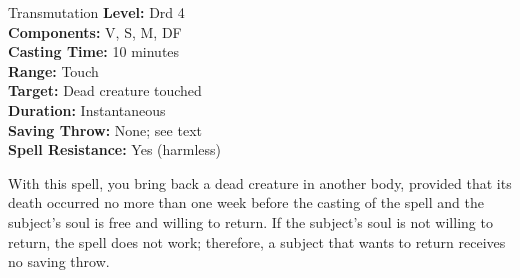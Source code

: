{Transmutation}
{
	\textbf{Level:}
	Drd 4\\
	\textbf{Components:}
	V, S, M, DF\\
	\textbf{Casting Time:}
	10 minutes\\
	\textbf{Range:}
	Touch\\
	\textbf{Target:}
	Dead creature touched\\
	\textbf{Duration:}
	Instantaneous\\
	\textbf{Saving Throw:}
	None; see text\\
	\textbf{Spell Resistance:}
	Yes (harmless)\\
}
{
	With this spell, you bring back a dead creature in another body, provided that its death occurred no more than one week before the casting of the spell and the subject's soul is free and willing to return. If the subject's soul is not willing to return, the spell does not work; therefore, a subject that wants to return receives no saving throw.

}
